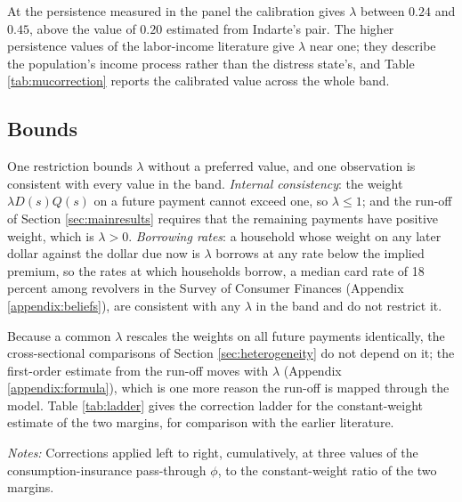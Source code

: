 \documentclass[12pt,english]{article}
\begin{document}
At the persistence measured in the panel the calibration gives $\lambda$ between $0.24$ and $0.45$, above the value of $0.20$ estimated from Indarte's pair. The higher persistence values of the labor-income literature give $\lambda$ near one; they describe the population's income process rather than the distress state's, and Table \ref{tab:mucorrection} reports the calibrated value across the whole band.

\subsection{Bounds}

One restriction bounds $\lambda$ without a preferred value, and one observation is consistent with every value in the band. \emph{Internal consistency}: the weight $\lambda D(s) Q(s)$ on a future payment cannot exceed one, so $\lambda \le 1$; and the run-off of Section \ref{sec:mainresults} requires that the remaining payments have positive weight, which is $\lambda > 0$. \emph{Borrowing rates}: a household whose weight on any later dollar against the dollar due now is $\lambda$ borrows at any rate below the implied premium, so the rates at which households borrow, a median card rate of 18 percent among revolvers in the Survey of Consumer Finances (Appendix \ref{appendix:beliefs}), are consistent with any $\lambda$ in the band and do not restrict it.

Because a common $\lambda$ rescales the weights on all future payments identically, the cross-sectional comparisons of Section \ref{sec:heterogeneity} do not depend on it; the first-order estimate from the run-off moves with $\lambda$ (Appendix \ref{appendix:formula}), which is one more reason the run-off is mapped through the model. Table \ref{tab:ladder} gives the correction ladder for the constant-weight estimate of the two margins, for comparison with the earlier literature.

\begin{table}[H]
\centering
\caption{The correction ladder for the constant-weight estimate, applied cumulatively}
\label{tab:ladder}


\vspace{0.5em}
\noindent \small \textit{Notes:} Corrections applied left to right, cumulatively, at three values of the consumption-insurance pass-through $\phi$, to the constant-weight ratio of the two margins.
\end{table}
\end{document}

